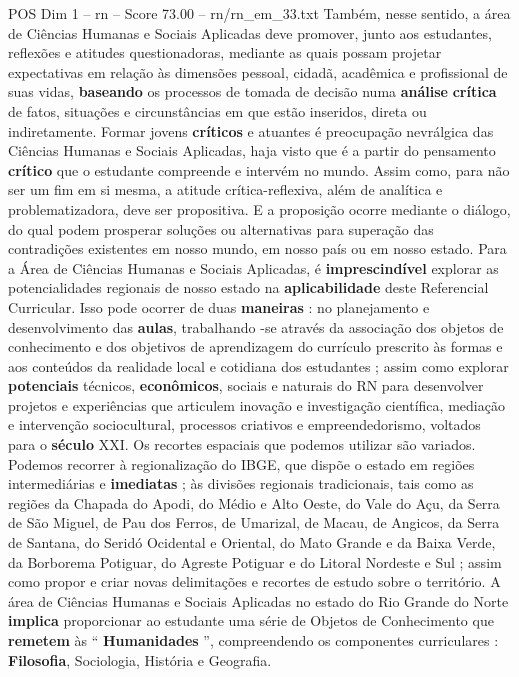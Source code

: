 \begin{textsample}{POS Dim 1 – rn – Score 73.00 – rn/rn\_em\_33.txt}
Também, nesse sentido, a área de Ciências Humanas e Sociais Aplicadas deve promover, junto aos estudantes, reflexões e atitudes questionadoras, mediante as quais possam projetar expectativas em relação às dimensões pessoal, cidadã, acadêmica e profissional de suas vidas, \textbf{baseando} os processos de tomada de decisão numa \textbf{análise} \textbf{crítica} de fatos, situações e circunstâncias em que estão inseridos, direta ou indiretamente.
Formar jovens \textbf{críticos} e atuantes é preocupação nevrálgica das Ciências Humanas e Sociais Aplicadas, haja visto que é a partir do pensamento \textbf{crítico} que o estudante compreende e intervém no mundo.
Assim como, para não ser um fim em si mesma, a atitude crítica-reflexiva, além de analítica e problematizadora, deve ser propositiva.
E a proposição ocorre mediante o diálogo, do qual podem prosperar soluções ou alternativas para superação das contradições existentes em nosso mundo, em nosso país ou em nosso estado.
Para a Área de Ciências Humanas e Sociais Aplicadas, é \textbf{imprescindível} explorar as potencialidades regionais de nosso estado na \textbf{aplicabilidade} deste Referencial Curricular.
Isso pode ocorrer de duas \textbf{maneiras} : no planejamento e desenvolvimento das \textbf{aulas}, trabalhando -se através da associação dos objetos de conhecimento e dos objetivos de aprendizagem do currículo prescrito às formas e aos conteúdos da realidade local e cotidiana dos estudantes ; assim como explorar \textbf{potenciais} técnicos, \textbf{econômicos}, sociais e naturais do RN para desenvolver projetos e experiências que articulem inovação e investigação científica, mediação e intervenção sociocultural, processos criativos e empreendedorismo, voltados para o \textbf{século} XXI.
Os recortes espaciais que podemos utilizar são variados.
Podemos recorrer à regionalização do IBGE, que dispõe o estado em regiões intermediárias e \textbf{imediatas} ; às divisões regionais tradicionais, tais como as regiões da Chapada do Apodi, do Médio e Alto Oeste, do Vale do Açu, da Serra de São Miguel, de Pau dos Ferros, de Umarizal, de Macau, de Angicos, da Serra de Santana, do Seridó Ocidental e Oriental, do Mato Grande e da Baixa Verde, da Borborema Potiguar, do Agreste Potiguar e do Litoral Nordeste e Sul ; assim como propor e criar novas delimitações e recortes de estudo sobre o território.
A área de Ciências Humanas e Sociais Aplicadas no estado do Rio Grande do Norte \textbf{implica} proporcionar ao estudante uma série de Objetos de Conhecimento que \textbf{remetem} às “ \textbf{Humanidades} ”, compreendendo os componentes curriculares : \textbf{Filosofia}, Sociologia, História e Geografia.

\end{textsample}

